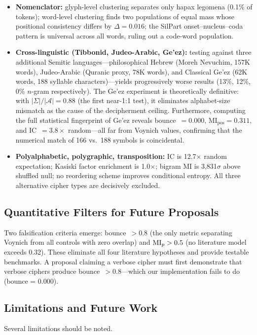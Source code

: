 \begin{itemize}[nosep]
  \item \textbf{Nomenclator:} glyph-level clustering separates only hapax legomena (0.1\% of tokens); word-level clustering finds two populations of equal mass whose positional consistency differs by $\Delta = 0.016$; the SilPart onset--nucleus--coda pattern is universal across all words, ruling out a code-word population.
  \item \textbf{Cross-linguistic (Tibbonid, Judeo-Arabic, Ge'ez):} testing against three additional Semitic languages---philosophical Hebrew (Moreh Nevuchim, 157K words), Judeo-Arabic (Quranic proxy, 78K words), and Classical Ge'ez (62K words, 188 syllable characters)---yields progressively worse results (13\%, 12\%, 0\% $n$-gram respectively).  The Ge'ez experiment is theoretically definitive: with $|\Sigma|/|\mathcal{A}| = 0.88$ (the first near-1:1 test), it eliminates alphabet-size mismatch as the cause of the decipherment ceiling.  Furthermore, computing the full statistical fingerprint of Ge'ez reveals bounce~$= 0.000$, MI$_{\text{pos}} = 0.311$, and IC~$= 3.8\times$ random---all far from Voynich values, confirming that the numerical match of 166 vs.\ 188 symbols is coincidental.
  \item \textbf{Polyalphabetic, polygraphic, transposition:} IC is 12.7$\times$ random expectation; Kasiski factor enrichment is 1.0$\times$; bigram MI is 3{,}831$\sigma$ above shuffled null; no reordering scheme improves conditional entropy.  All three alternative cipher types are decisively excluded.
\end{itemize}

\subsection{Quantitative Filters for Future Proposals}

Two falsification criteria emerge: bounce~$> 0.8$ (the only metric separating Voynich from all controls with zero overlap) and $\mathrm{MI}_p > 0.5$ (no literature model exceeds 0.32).  These eliminate all four literature hypotheses and provide testable benchmarks.  A proposal claiming a verbose cipher must first demonstrate that verbose ciphers produce bounce~$> 0.8$---which our implementation fails to do (bounce = 0.000).

\subsection{Limitations and Future Work}

Several limitations should be noted.

